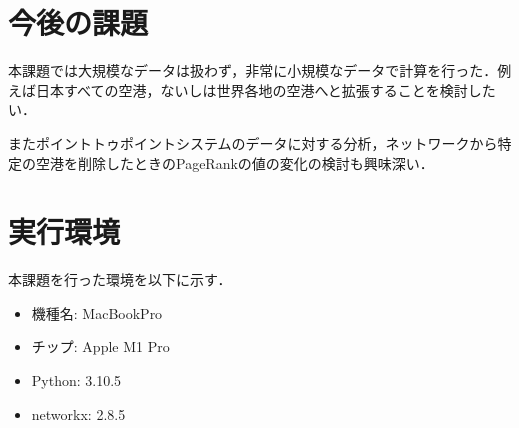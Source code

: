 \documentclass[a4j, dvipdfmx, twocolumn]{jsarticle}
\begin{document}
\section{今後の課題}
本課題では大規模なデータは扱わず，非常に小規模なデータで計算を行った．例えば日本すべての空港，ないしは世界各地の空港へと拡張することを検討したい．

またポイントトゥポイントシステムのデータに対する分析，ネットワークから特定の空港を削除したときのPageRankの値の変化の検討も興味深い．




\appendix
\section{実行環境}
\label{sec:env}
本課題を行った環境を以下に示す．
\begin{itemize}
\item 機種名: MacBookPro 
\item チップ: Apple M1 Pro
\item Python: 3.10.5
\item networkx: 2.8.5
\end{itemize}
\end{document}
